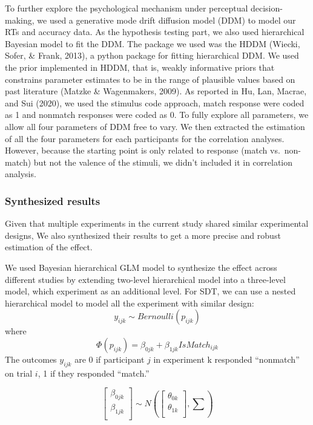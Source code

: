 \documentclass[
  english,
  man]{apa6}
\begin{document}
To further explore the psychological mechanism under perceptual decision-making, we used a generative mode drift diffusion model (DDM) to model our RTs and accuracy data. As the hypothesis testing part, we also used hierarchical Bayesian model to fit the DDM. The package we used was the HDDM (Wiecki, Sofer, \& Frank, 2013), a python package for fitting hierarchical DDM. We used the prior implemented in HDDM, that is, weakly informative priors that constrains parameter estimates to be in the range of plausible values based on past literature (Matzke \& Wagenmakers, 2009). As reported in Hu, Lan, Macrae, and Sui (2020), we used the stimulus code approach, match response were coded as 1 and nonmatch responses were coded as 0. To fully explore all parameters, we allow all four parameters of DDM free to vary. We then extracted the estimation of all the four parameters for each participants for the correlation analyses. However, because the starting point is only related to response (match vs.~non-match) but not the valence of the stimuli, we didn't included it in correlation analysis.

\hypertarget{synthesized-results}{%
\subsubsection{Synthesized results}\label{synthesized-results}}

Given that multiple experiments in the current study shared similar experimental designs, We also synthesized their results to get a more precise and robust estimation of the effect.

We used Bayesian hierarchical GLM model to synthesize the effect across different studies by extending two-level hierarchical model into a three-level model, which experiment as an additional level. For SDT, we can use a nested hierarchical model to model all the experiment with similar design:
\[y_{ijk} \sim Bernoulli(p_{ijk})\]
where
\[ \Phi(p_{ijk}) =  \beta_{0jk} + \beta_{1jk}IsMatch_{ijk}\]
The outcomes \(y_{ijk}\) are 0 if participant \(j\) in experiment k responded ``nonmatch'' on trial \(i\), 1 if they responded ``match.''

\[\begin{bmatrix}\beta_{0jk}\\
\beta_{1jk}\\
\end{bmatrix} \sim N(\begin{bmatrix}\theta_{0k}\\
\theta_{1k}\\
\end{bmatrix}, \sum)\]
\end{document}
